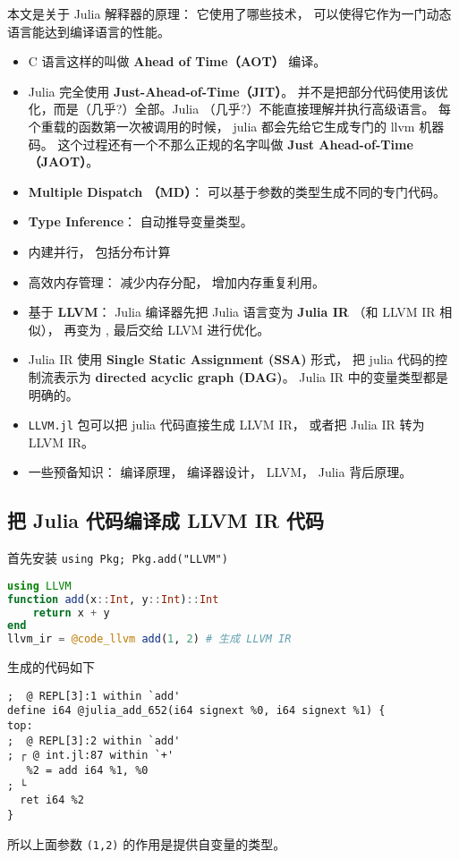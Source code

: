 
\begin{issues}
\issueDraft
\end{issues}

本文是关于 Julia 解释器的原理： 它使用了哪些技术， 可以使得它作为一门动态语言能达到编译语言的性能。

\begin{itemize}
\item C 语言这样的叫做 \textbf{Ahead of Time（AOT）} 编译。
\item Julia 完全使用 \textbf{Just-Ahead-of-Time（JIT）}。 并不是把部分代码使用该优化，而是（几乎?）全部。Julia （几乎?）不能直接理解并执行高级语言。 每个重载的函数第一次被调用的时候， julia 都会先给它生成专门的 llvm 机器码。 这个过程还有一个不那么正规的名字叫做 \textbf{Just Ahead-of-Time（JAOT）}。
\item \textbf{Multiple Dispatch （MD）}： 可以基于参数的类型生成不同的专门代码。
\item \textbf{Type Inference}： 自动推导变量类型。
\item 内建并行， 包括分布计算
\item 高效内存管理： 减少内存分配， 增加内存重复利用。
\item 基于 \textbf{LLVM}： Julia 编译器先把 Julia 语言变为 \textbf{Julia IR} （和 LLVM IR 相似）， 再变为 , 最后交给 LLVM 进行优化。
\item Julia IR 使用 \textbf{Single Static Assignment (SSA)} 形式， 把 julia 代码的控制流表示为 \textbf{directed acyclic graph (DAG)}。 Julia IR 中的变量类型都是明确的。
\item \verb`LLVM.jl` 包可以把 julia 代码直接生成 LLVM IR， 或者把 Julia IR 转为 LLVM IR。
\item 一些预备知识： 编译原理， 编译器设计， LLVM， Julia 背后原理。
\end{itemize}

\subsection{把 Julia 代码编译成 LLVM IR 代码}
首先安装 \verb`using Pkg; Pkg.add("LLVM")`
\begin{lstlisting}[language=julia]
using LLVM
function add(x::Int, y::Int)::Int
    return x + y
end
llvm_ir = @code_llvm add(1, 2) # 生成 LLVM IR
\end{lstlisting}
生成的代码如下
\begin{lstlisting}[language=none]
;  @ REPL[3]:1 within `add'
define i64 @julia_add_652(i64 signext %0, i64 signext %1) {
top:
;  @ REPL[3]:2 within `add'
; ┌ @ int.jl:87 within `+'
   %2 = add i64 %1, %0
; └
  ret i64 %2
}
\end{lstlisting}
所以上面参数 \verb`(1,2)` 的作用是提供自变量的类型。
